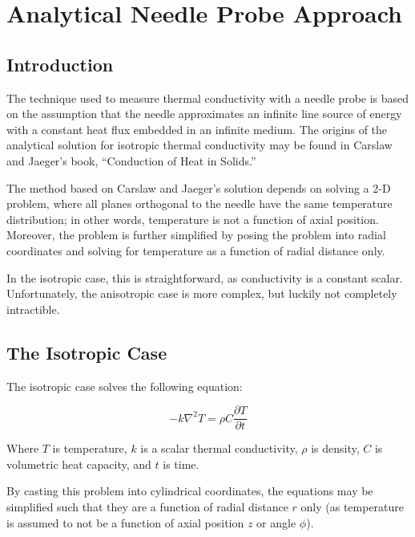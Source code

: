 \chapter{Analytical Needle Probe Approach}
\label{sec:analytical-np}
\bigskip

\section{Introduction}
\label{sec:analytical-np:intro}

The technique used to measure thermal conductivity with a needle probe is based on the assumption that the needle approximates an infinite line source of energy with a constant heat flux embedded in an infinite medium. The origins of the analytical solution for isotropic thermal conductivity may be found in Carslaw and Jaeger's book, ``Conduction of Heat in Solids.'' 

The method based on Carslaw and Jaeger's solution depends on solving a 2-D problem, where all planes orthogonal to the needle have the same temperature distribution; in other words, temperature is not a function of axial position. Moreover, the problem is further simplified by posing the problem into radial coordinates and solving for temperature as a function of radial distance only.

In the isotropic case, this is straightforward, as conductivity is a constant scalar. Unfortunately, the anisotropic case is more complex, but luckily not completely intractible.

\section{The Isotropic Case}
\label{sec:analytical-np:isotropic}

The isotropic case solves the following equation:

\begin{equation*}
-k\nabla^2 T = \rho C\frac{\partial T}{\partial t}
\end{equation*}

Where \(T\) is temperature, \(k\) is a scalar thermal conductivity, \(\rho\) is density, \(C\) is volumetric heat capacity, and \(t\) is time.


By casting this problem into cylindrical coordinates, the equations may be simplified such that they are a function of radial distance \(r\) only (as temperature is assumed to not be a function of axial position \(z\) or angle \(\phi\)).

